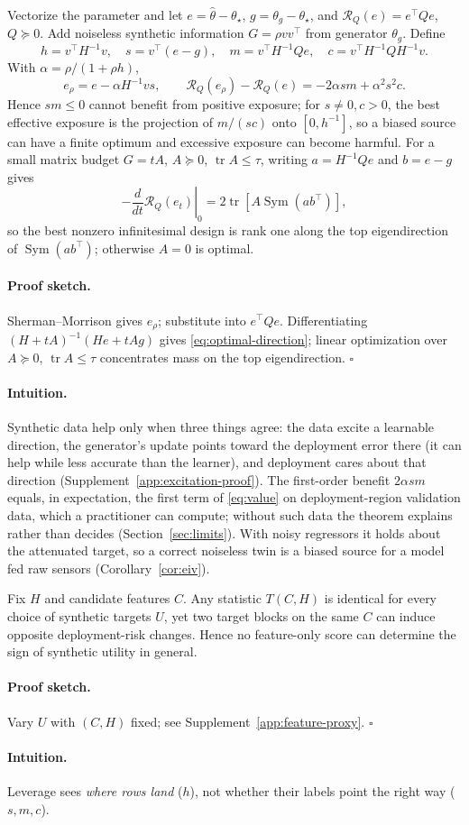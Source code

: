 \documentclass{l4dc2027}
\newcommand{\tr}{\operatorname{tr}}
\newcommand{\ProofSketch}{\paragraph{Proof sketch.}}
\newcommand{\Intuition}{\paragraph{Intuition.}}
\begin{document}
\begin{theorem}\label{thm:excitation}
Vectorize the parameter and let $e=\widehat\theta-\theta_\star$, $g=\theta_g-\theta_\star$, and $\mathcal R_Q(e)=e^\top Qe$, $Q\succeq0$. Add noiseless synthetic information $G=\rho vv^\top$ from generator $\theta_g$. Define
\[
h=v^\top H^{-1}v,\quad s=v^\top(e-g),\quad m=v^\top H^{-1}Qe,\quad c=v^\top H^{-1}QH^{-1}v.
\]
With $\alpha=\rho/(1+\rho h)$,
\begin{equation}\label{eq:rankone-risk}
e_\rho=e-\alpha H^{-1}vs,\qquad
\mathcal R_Q(e_\rho)-\mathcal R_Q(e)=-2\alpha sm+\alpha^2s^2c.
\end{equation}
Hence $sm\le0$ cannot benefit from positive exposure; for $s\ne0,c>0$, the best effective exposure is the projection of $m/(sc)$ onto $[0,h^{-1}]$, so a biased source can have a finite optimum and excessive exposure can become harmful. For a small matrix budget $G=tA$, $A\succeq0$, $\tr A\le\tau$, writing $a=H^{-1}Qe$ and $b=e-g$ gives
\begin{equation}\label{eq:optimal-direction}
-\left.\frac{d}{dt}\mathcal R_Q(e_t)\right|_0=2\tr[A\operatorname{Sym}(ab^\top)],
\end{equation}
so the best nonzero infinitesimal design is rank one along the top eigendirection of $\operatorname{Sym}(ab^\top)$; otherwise $A=0$ is optimal.
\end{theorem}
\ProofSketch Sherman--Morrison gives $e_\rho$; substitute into $e^\top Qe$. Differentiating $(H+tA)^{-1}(He+tAg)$ gives \eqref{eq:optimal-direction}; linear optimization over $A\succeq0$, $\tr A\le\tau$ concentrates mass on the top eigendirection. \hfill$\square$
\Intuition Synthetic data help only when three things agree: the data excite a learnable direction, the generator's update points toward the deployment error there (it can help while less accurate than the learner), and deployment cares about that direction (Supplement~\ref{app:excitation-proof}). The first-order benefit $2\alpha sm$ equals, in expectation, the first term of \eqref{eq:value} on deployment-region validation data, which a practitioner can compute; without such data the theorem explains rather than decides (Section~\ref{sec:limits}). With noisy regressors it holds about the attenuated target, so a correct noiseless twin is a biased source for a model fed raw sensors (Corollary~\ref{cor:eiv}).

\begin{proposition}\label{prop:leverage}
Fix $H$ and candidate features $C$. Any statistic $T(C,H)$ is identical for every choice of synthetic targets $U$, yet two target blocks on the same $C$ can induce opposite deployment-risk changes. Hence no feature-only score can determine the sign of synthetic utility in general.
\end{proposition}
\ProofSketch Vary $U$ with $(C,H)$ fixed; see Supplement~\ref{app:feature-proxy}. \hfill$\square$
\Intuition Leverage sees \emph{where rows land} ($h$), not whether their labels point the right way ($s,m,c$).
\end{document}
